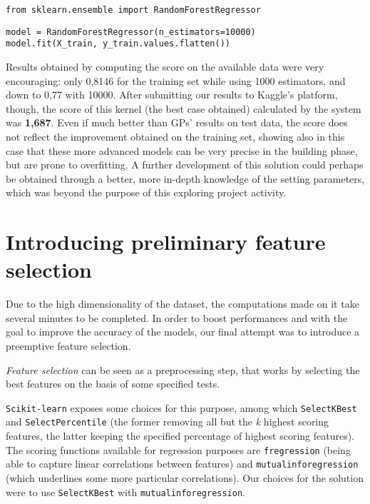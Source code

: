 \begin{lstlisting}[firstnumber=14]
from sklearn.ensemble import RandomForestRegressor
\end{lstlisting}

\begin{lstlisting}[firstnumber=115]
model = RandomForestRegressor(n_estimators=10000)
model.fit(X_train, y_train.values.flatten())
\end{lstlisting}


Results obtained by computing the score on the available data were very encouraging: only 0,8146 for the training set while using 1000 estimators, and down to 0,77
with 10000. After submitting our results to Kaggle's platform, though, the score of this kernel (the best case obtained) calculated by the system was \textbf{1,687}. Even if much better than GPs' results on test data, the score does not reflect the improvement obtained on the training set, showing also in this case that these more advanced models can be very precise in the building phase, but are prone to overfitting. A further development of this solution could perhaps be obtained through a better, more in-depth knowledge of the setting parameters, which was beyond the purpose of this exploring project activity.

\section[Feature selection]{Introducing preliminary feature selection}
Due to the high dimensionality of the dataset, the computations made on it take several minutes to be completed. In order to boost performances and with the goal to improve the accuracy of the models, our final attempt was to introduce a preemptive feature selection.

\textit{Feature selection} can be seen as a preprocessing step, that works by selecting the best features on the basis of some specified tests.

\texttt{Scikit-learn} exposes some choices for this purpose, among which \texttt{SelectKBest} and \texttt{SelectPercentile} (the former removing all but the \textit{k} highest scoring features, the latter keeping the specified percentage of highest scoring features). The scoring functions available for regression purposes are \texttt{f\textunderscore regression} (being able to capture linear correlations between features) and \texttt{mutual\textunderscore info\textunderscore regression} (which underlines some more particular correlations). Our choices for the solution were to use \texttt{SelectKBest} with \texttt{mutual\textunderscore info\textunderscore regression}.

